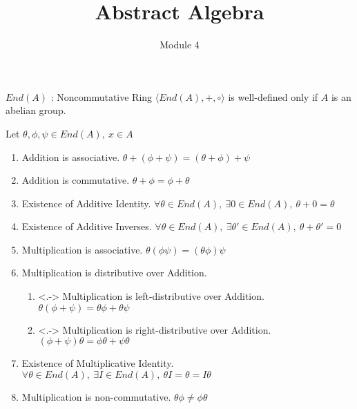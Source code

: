 \documentclass{beamer}
\title{Abstract Algebra}
\author{Module 4}
\institute{Section 24 : Noncommutative Examples}
\begin{document}
\begin{frame}
	\maketitle
\end{frame}

\begin{frame}{$End(A)$ : Noncommutative Ring}
	\alert{$\langle End(A),+,\circ \rangle$ is well-defined only if $A$ is an abelian group.} 

	Let $\theta, \phi, \psi \in End(A),\ x \in A$
\begin{enumerate}
	\item<+-> Addition is associative. $\theta + (\phi + \psi) = (\theta + \phi ) + \psi$
	\item<+-> Addition is commutative. $\theta + \phi = \phi + \theta$
	\item<+-> Existence of Additive Identity. $\forall \theta \in End(A),\ \exists 0 \in End(A),\ \theta + 0 = \theta$
	\item<+-> Existence of Additive Inverses. $\forall \theta \in End(A),\ \exists \theta' \in End(A),\ \theta + \theta' = 0$
	\item<+-> Multiplication is associative. $\theta (\phi\psi)=(\theta\phi)\psi$
	\item<+-> Multiplication is distributive over Addition.
	\begin{enumerate}
		\item<.-> Multiplication is left-distributive over Addition.
			$\theta(\phi+\psi) = \theta\phi + \theta\psi$
		\item<.-> Multiplication is right-distributive over Addition.
			$(\phi+\psi)\theta = \phi\theta + \psi\theta$
	\end{enumerate}
	\item<+-> Existence of Multiplicative Identity. $\forall \theta \in End(A),\ \exists I \in End(A),\ \theta I = \theta = I\theta$
	\item<+-> Multiplication is non-commutative. $\theta\phi \ne \phi\theta$
\end{enumerate}
\end{frame}
\end{document}
